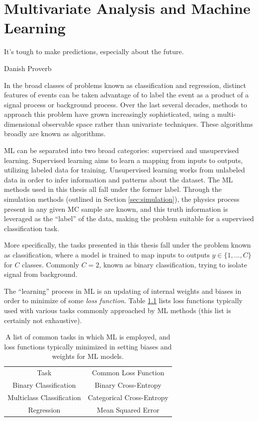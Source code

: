 
\chapter{Multivariate Analysis and Machine Learning}
\epigraph{It's tough to make predictions, especially about the future.}{Danish Proverb}
\label{app:MVA}

In the broad classes of problems known as classification and regression, distinct features of events can be taken advantage of to label the event as a product of a signal process or background process. Over the last several decades, methods to approach this problem have grown increasingly sophisticated, using a multi-dimensional observable space rather than univariate techniques. These algorithms broadly are known as  algorithms.


\gls{ML} can be separated into two broad categories: supervised and unsupervised learning. Supervised learning aims to learn a mapping from inputs to outputs, utilizing labeled data for training. Unsupervised learning works from unlabeled data in order to infer information and patterns about the dataset. The \gls{ML} methods used in this thesis all fall under the former label. Through the simulation methods (outlined in Section \ref{sec:simulation}), the physics process present in any given \gls{MC} sample are known, and this truth information is leveraged as the ``label'' of the data, making the problem suitable for a supervised classification task.

More specifically, the tasks presented in this thesis fall under the problem known as classification, where a model is trained to map inputs to outputs $y \in \{1,...,C\}$ for $C$ classes. Commonly $C=2$, known as binary classification, trying to isolate signal from background.  

The ``learning'' process in \gls{ML} is an updating of internal weights and biases in order to minimize of some \textit{loss function}. Table \ref{tab:loss-functions} lists loss functions typically used with various tasks commonly approached by \gls{ML} methods (this list is certainly not exhaustive).

\begin{table}[!ht]
    \centering
    \begin{tabular}{c|c}
        Task                  & Common Loss Function \\
        \cline{1-2}
        Binary Classification     & Binary Cross-Entropy\\
        Multiclass Classification & Categorical Cross-Entropy\\
        Regression                & Mean Squared Error
    \end{tabular}  
    \caption[A list of common tasks in which \gls{ML} is employed, and loss functions typically used.]{A list of common tasks in which \gls{ML} is employed, and loss functions typically minimized in setting biases and weights for \gls{ML} models.}
    \label{tab:loss-functions}
\end{table}


